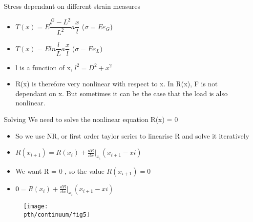 	\begin{frame}
		
	\begin{block}{Stress dependant on different strain measures}
		\begin{itemize}
			\item $T(x) = E \dfrac{l^2-L^2}{L^2} a \dfrac{x}{l}$  \hfill ($\sigma =  E \varepsilon_G$)
			\item $T(x) = E ln\dfrac{l}{L} a \dfrac{x}{l}$ \hfill	($\sigma =  E \varepsilon_L$)			
		\end{itemize}
	\end{block}

	\begin{itemize}
		\item l is a function of x, $l^2=D^2+x^2$
		\item R(x) is therefore very nonlinear with respect to x. In R(x), F is not dependant on x. But sometimes it can be the case that the load is also nonlinear.	
	\end{itemize}
	
	\begin{block}{Solving}
		We need to solve the nonlinear equation R(x) = 0
		
		\begin{itemize}
			\item So we use NR, or first order taylor series to linearise R and solve it iteratively
			
			\item $R(x_{i+1}) = R(x_{i}) + \frac{dR}{dx}|_{x_{i}}(x_{i+1}-x{i})$
			\item We want R = 0 , so the value $R(x_{i+1}) = 0$
			\item  $0 = R(x_{i}) + \frac{dR}{dx}|_{x_{i}}(x_{i+1}-x{i})$		
		\end{itemize}
	\end{block}
	\end{frame}

	\begin{frame}
			\begin{figure}
			\centering
			\texttt{[image: \\pth/continuum/fig5]}
			\label{fig:fig1}
		\end{figure}
	\end{frame}

